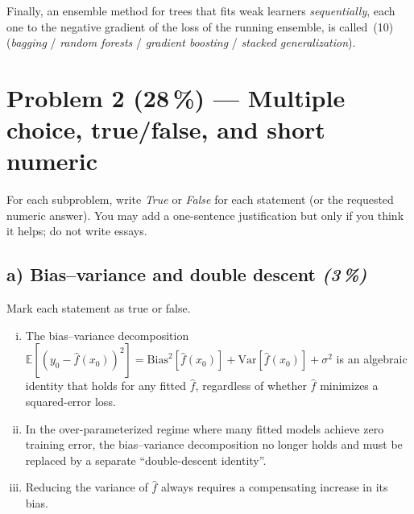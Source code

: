 \documentclass[11pt,a4paper]{article}
\newcommand{\points}[1]{\textbf{(#1\,\%)}}
\newcommand{\subpoints}[1]{\textit{(#1\,\%)}}
\begin{document}
Finally, an ensemble method for trees that fits weak learners \emph{sequentially}, each one to the negative gradient of the loss of the running ensemble, is called \underline{\hspace{2.5cm}}\,(10) (\emph{bagging} / \emph{random forests} / \emph{gradient boosting} / \emph{stacked generalization}).

\vfill\eject

\section*{Problem 2 \points{28} --- Multiple choice, true/false, and short numeric}

For each subproblem, write \emph{True} or \emph{False} for each statement (or the requested numeric answer). You may add a one-sentence justification but only if you think it helps; do not write essays.

\subsection*{a) Bias--variance and double descent \subpoints{3}}
Mark each statement as true or false.
\begin{enumerate}[(i)]
  \item The bias--variance decomposition $\mathbb{E}[(y_0-\hat f(x_0))^2] = \mathrm{Bias}^2[\hat f(x_0)] + \mathrm{Var}[\hat f(x_0)] + \sigma^2$ is an algebraic identity that holds for any fitted $\hat f$, regardless of whether $\hat f$ minimizes a squared-error loss.
  \item In the over-parameterized regime where many fitted models achieve zero training error, the bias--variance decomposition no longer holds and must be replaced by a separate ``double-descent identity''.
  \item Reducing the variance of $\hat f$ always requires a compensating increase in its bias.
\end{enumerate}
\end{document}

